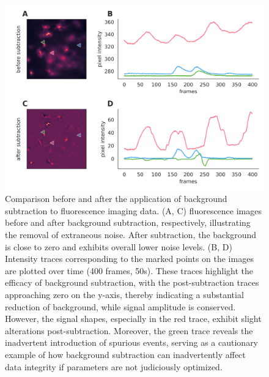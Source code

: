 \documentclass[utf8]{FrontiersinHarvard}
\begin{document}
    \begin{figure}[!htb]
        \begin{center}
            \includegraphics[width=\linewidth]{figures/4}
        \end{center}
        \caption{
            Comparison before and after the application of background subtraction to fluorescence imaging data. (A, C) fluorescence images before and after background subtraction, respectively, illustrating the removal of extraneous noise. After subtraction, the background is close to zero and exhibits overall lower noise levels. (B, D) Intensity traces corresponding to the marked points on the images are plotted over time (400 frames, 50s). These traces highlight the efficacy of background subtraction, with the post-subtraction traces approaching zero on the y-axis, thereby indicating a substantial reduction of background, while signal amplitude is conserved. However, the signal shapes, especially in the red trace, exhibit slight alterations post-subtraction. Moreover, the green trace reveals the inadvertent introduction of spurious events, serving as a cautionary example of how background subtraction can inadvertently affect data integrity if parameters are not judiciously optimized.
        }\label{fig:4}
    \end{figure}
\end{document}
